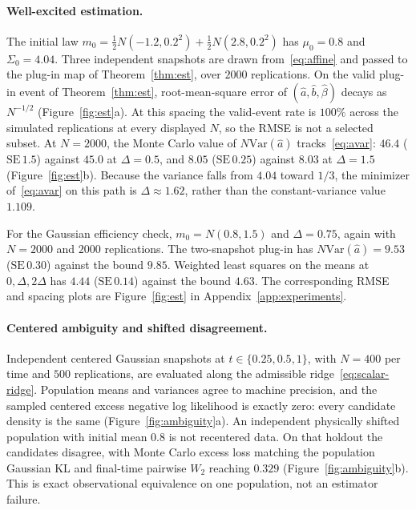 \documentclass[anon,11pt]{alt2027}
\newcommand{\Var}{\mathrm{Var}}
\begin{document}
\paragraph{Well-excited estimation.}
The initial law
$m_0=\tfrac12 N(-1.2,0.2^2)+\tfrac12 N(2.8,0.2^2)$ has $\mu_0=0.8$ and
$\Sigma_0=4.04$. Three independent snapshots are drawn from~\eqref{eq:affine}
and passed to the plug-in map of Theorem~\ref{thm:est}, over $2000$
replications. On the valid plug-in event of Theorem~\ref{thm:est},
root-mean-square error of $(\hat a,\hat b,\hat\beta)$ decays as
$N^{-1/2}$ (Figure~\ref{fig:est}a). At this spacing the valid-event rate is
$100\%$ across the simulated replications at every displayed $N$, so the RMSE
is not a selected subset. At $N=2000$, the Monte Carlo value of
$N\Var(\hat a)$ tracks~\eqref{eq:avar}: $46.4$ ($\mathrm{SE}\,1.5$) against
$45.0$ at $\Delta=0.5$,
and $8.05$ ($\mathrm{SE}\,0.25$) against $8.03$ at $\Delta=1.5$ (Figure~\ref{fig:est}b). Because the
variance falls from $4.04$ toward $1/3$, the minimizer of~\eqref{eq:avar} on
this path is $\Delta\approx 1.62$, rather than the constant-variance value
$1.109$.

For the Gaussian efficiency check, $m_0=N(0.8,1.5)$ and $\Delta=0.75$, again
with $N=2000$ and $2000$ replications. The two-snapshot plug-in has
$N\Var(\hat a)=9.53$ ($\mathrm{SE}\,0.30$) against the bound $9.85$. Weighted least squares on the
means at $0,\Delta,2\Delta$ has $4.44$ ($\mathrm{SE}\,0.14$) against the bound $4.63$.
The corresponding RMSE and spacing plots are Figure~\ref{fig:est} in
Appendix~\ref{app:experiments}.

\paragraph{Centered ambiguity and shifted disagreement.}
Independent centered Gaussian snapshots at $t\in\{0.25,0.5,1\}$, with
$N=400$ per time and $500$ replications, are evaluated along the admissible
ridge~\eqref{eq:scalar-ridge}. Population means and variances agree to machine
precision, and the sampled centered excess negative log likelihood is exactly
zero: every candidate density is the same (Figure~\ref{fig:ambiguity}a). An
independent physically shifted population with initial mean $0.8$ is not
recentered data. On that holdout the candidates disagree, with Monte Carlo
excess loss matching the population Gaussian KL and final-time pairwise
$W_2$ reaching $0.329$ (Figure~\ref{fig:ambiguity}b). This is exact
observational equivalence on one population, not an estimator failure.
\end{document}
